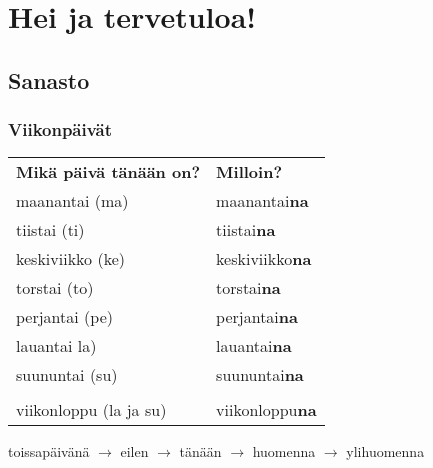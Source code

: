 \documentclass[../päätiedosto/pää.tex]{subfiles}
\begin{document}
\chapter{Hei ja tervetuloa!}
\label{kap1}
\section{Sanasto}
\label{sanasto-1}
\subsection{Viikonpäivät}
\label{viikpai}

\begin{tabularx}{\textwidth}{X X}
\textbf{Mikä päivä tänään on?} & \textbf{Milloin?} \\
maanantai (ma)                       & maanantai\textbf{na}       \\
tiistai (ti)                         & tiistai\textbf{na}        \\
keskiviikko (ke)                     & keskiviikko\textbf{na}     \\
torstai (to)                         & torstai\textbf{na}         \\
perjantai (pe)                       & perjantai\textbf{na}       \\
lauantai la)                         & lauantai\textbf{na}        \\
suununtai (su)                       & suununtai\textbf{na}       \\
                                     &                   \\
viikonloppu (la ja su)               & viikonloppu\textbf{na}     \\
\end{tabularx}%
\vspace{2mm}
toissapäivänä $\rightarrow$ eilen $\rightarrow$ tänään $\rightarrow$ huomenna $\rightarrow$ ylihuomenna
\end{document}
